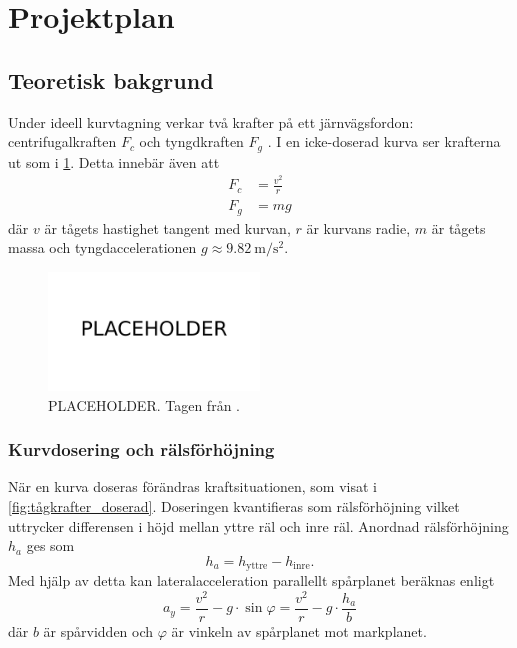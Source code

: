 \section{Projektplan}
\subsection{Teoretisk bakgrund}
Under ideell kurvtagning verkar två krafter på ett järnvägsfordon: centrifugalkraften $F_c$ och tyngdkraften $F_g$ \parencite{carlos}. I en icke-doserad kurva ser krafterna ut som i \cref{fig:tågkrafter}. Detta innebär även att
\begin{align}
    F_c &= \frac{v^2}{r} \\
    F_g &= mg
\end{align}
där $v$ är tågets hastighet tangent med kurvan, $r$ är kurvans radie, $m$ är tågets massa och tyngdaccelerationen $g\approx \SI{9.82}{\m\per\s\squared}$.

\begin{figure}[h]
    \centering
    \includegraphics[width=0.5\textwidth]{fig/placeholder.png}
    \caption{PLACEHOLDER. Tagen från \textcite{carlos}.}
    \label{fig:tågkrafter}
\end{figure}


\subsubsection{Kurvdosering och rälsförhöjning}
När en kurva doseras förändras kraftsituationen, som visat i \cref{fig:tågkrafter_doserad}. Doseringen kvantifieras som rälsförhöjning vilket uttrycker differensen i höjd mellan yttre räl och inre räl. Anordnad rälsförhöjning $h_a$ ges som
\begin{equation}
    h_a = h_\mathrm{yttre} - h_\mathrm{inre}.
\end{equation}
Med hjälp av detta kan lateralacceleration parallellt spårplanet beräknas enligt \parencite{carlos}
\begin{equation}
    a_y = \frac{v^2}{r}-g\cdot\sin{\varphi} = \frac{v^2}{r} - g\cdot \frac{h_a}{b}
\end{equation}
där $b$ är spårvidden och $\varphi$ är vinkeln av spårplanet mot markplanet.

